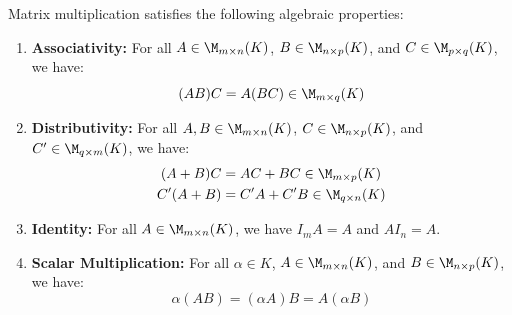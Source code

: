 \begin{proposition} 
\label{prop:matrix_multiplication_properties}
Matrix multiplication satisfies the following algebraic properties:
\begin{enumerate}
    \item \textbf{Associativity:} For all $A \in \M_{m \times n}(K)$, $B \in \M_{n \times p}(K)$, and $C \in \M_{p \times q}(K)$, we have:
    \begin{equation*}
        (AB)C = A(BC) \in \M_{m \times q}(K)
    \end{equation*}
    \item \textbf{Distributivity:} For all $A, B \in \M_{m \times n}(K)$, $C \in \M_{n \times p}(K)$, and $C' \in \M_{q \times m}(K)$, we have:
    \begin{align*}
        (A + B)C &= AC + BC \in \M_{m \times p}(K) \\
        C'(A + B) &= C'A + C'B \in \M_{q \times n}(K)
    \end{align*}
    \item \textbf{Identity:} For all $A \in \M_{m \times n}(K)$, we have $I_m A = A$ and $A I_n = A$.
    \item \textbf{Scalar Multiplication:} For all $\alpha \in K$, $A \in \M_{m \times n}(K)$, and $B \in \M_{n \times p}(K)$, we have:
    \begin{equation*}
        \alpha(AB) = (\alpha A)B = A(\alpha B)
    \end{equation*}
\end{enumerate}
\end{proposition}

